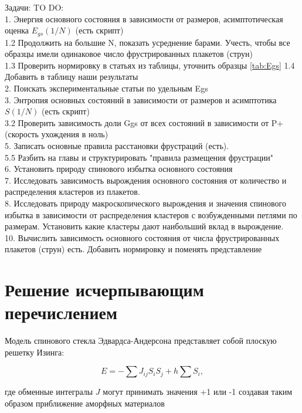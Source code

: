 \documentclass[utf8, babel, sor, jor, amsmath, amssymb, reprint]{elsarticle} %
\begin{document}
Задачи:
TO DO: \\
1. Энергия основного состояния в зависимости от размеров, асимптотическая оценка $E_{gs}(1/N)$ (есть скрипт)\\
1.2 Продолжить на большие N, показать усреднение барами. Учесть, чтобы все образцы имели одинаковое число фрустрированных плакетов (струн) \\
1.3 Проверить нормировку в статьях из таблицы, уточнить образцы \ref{tab:Egs}
1.4 Добавить в таблицу наши результаты\\
2. Поискать экспериментальные статьи по удельным Egs\\
3. Энтропия основных состояний в зависимости от размеров и асимптотика $S(1/N)$  (есть скрипт)\\
3.2 Проверить зависимость доли Ggs от всех состояний в зависимости от P+ (скорость ухождения в ноль)\\
5. Записать основные правила расстановки фрустраций (есть).\\
5.5 Разбить на главы и структурировать "правила размещения фрустрации"\\
6. Установить природу спинового избытка основного состояния \\
7. Исследовать зависимость вырождения основного состояния от количество и распределения кластеров из плакетов.\\
8. Исследовать природу макроскопического вырождения и значения спинового избытка в зависимости от распределения кластеров с возбужденными петлями по размерам. Установить какие кластеры дают наибольший вклад в вырождение. \\
10. Вычислить зависимость основного состояния от числа фрустрированных плакетов (струн) есть. Добавить нормировку и поменять представление\\



\section{Решение исчерпывающим перечислением}

Модель спинового стекла Эдвардса-Андерсона представляет собой плоскую решетку Изинга:

\begin{equation}
	E = -\sum J_{ij} S_i S_j + h \sum S_i,
	\label{eq:ising_energy}
\end{equation}

 где обменные интегралы $J$ могут принимать значения +1 или -1 создавая таким образом приближение аморфных материалов
\end{document}
